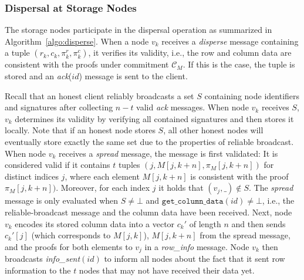 \documentclass[sigconf,screen]{acmart}
\begin{document}
\subsubsection{Dispersal at Storage Nodes}

The storage nodes participate in the dispersal operation as summarized in Algorithm~\ref{algo:disperse}.
When a node $v_k$ receives a \emph{disperse} message containing
a tuple $(r_k,c_k,\pi_k^r,\pi_k^c)$, it verifies its validity, i.e., the row and column data are consistent with the proofs under commitment $\mathcal{C}_M$. If this is the case, the tuple is stored and an \emph{ack}($id$) message is sent to the client.

Recall that an honest client reliably broadcasts a set $S$ containing node identifiers and signatures after collecting $n-t$ valid \emph{ack} messages. When node $v_k$ receives $S$, $v_k$ determines its validity by verifying all contained signatures and then stores it locally. Note that if an honest node stores $S$, all other honest nodes will eventually store exactly the same set due to the properties of reliable broadcast.
When node $v_k$ receives a \emph{spread} message, the message is first validated: It is considered valid if it contains $t$ tuples $(j, M[j,k+n], \pi_M[j,k+n])$ for distinct indices $j$, where each element $M[j,k+n]$ is consistent with the proof $\pi_M[j,k+n])$. 
Moreover, for each index $j$ it holds that $(v_j,\_) \notin S$. The \emph{spread} message is only evaluated when $S \ne \bot$ and $\texttt{get\_column\_data}(id) \neq \bot$, i.e., the reliable-broadcast message and the column data have been received.
Next, node $v_k$ encodes its stored column data into a vector $c_k'$ of length $n$ and then sends $c_k'[j]$ (which corresponds to $M[j,k]$), $M[j,k+n]$ from the spread message, and the proofs for both elements to $v_j$ in a \emph{row\_info} message. Node $v_k$ then broadcasts \emph{info\_sent}$(id)$ to inform all nodes about the fact that it sent row information to the $t$ nodes that may not have received their data yet.
\end{document}
